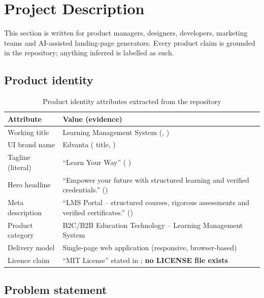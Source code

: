 \section{Project Description}
\label{sec:project-description}

This section is written for product managers, designers, developers, marketing teams and AI-assisted landing-page generators. Every product claim is grounded in the repository; anything inferred is labelled as such.

\subsection{Product identity}

\begin{table}[H]
\centering
\caption{Product identity attributes extracted from the repository}
\label{tab:product-identity}
\begin{tabular}{@{}L{4.2cm}L{10.0cm}@{}}
\toprule
\textbf{Attribute} & \textbf{Value (evidence)} \\
\midrule
Working title & Learning Management System (, ) \\
UI brand name & Edvanta ( title, ) \\
Tagline (literal) & ``Learn Your Way'' ( ) \\
Hero headline & ``Empower your future with structured learning and verified credentials.'' () \\
Meta description & ``LMS Portal -- structured courses, rigorous assessments and verified certificates.'' () \\
Product category & B2C/B2B Education Technology -- Learning Management System \\
Delivery model & Single-page web application (responsive, browser-based) \\
Licence claim & ``MIT License'' stated in ; \textbf{no LICENSE file exists} \\
\bottomrule
\end{tabular}
\end{table}

\subsection{Problem statement}

